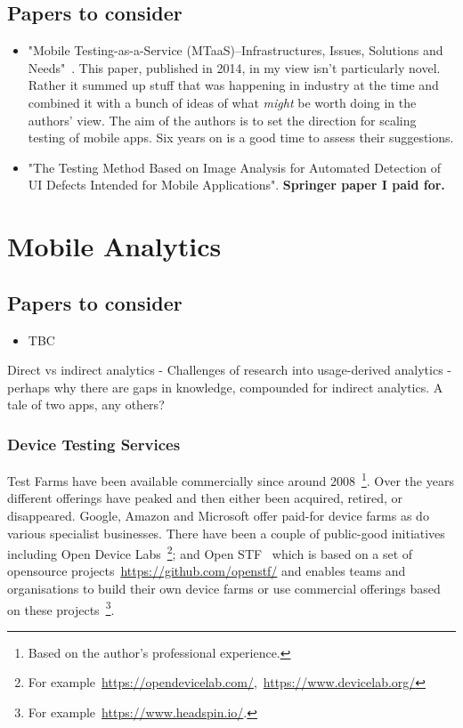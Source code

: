 \subsection{Papers to consider}
\begin{itemize}
    \item "Mobile Testing-as-a-Service (MTaaS)--Infrastructures, Issues, Solutions and Needs"~\cite{gao2014mobile}. This paper, published in 2014, in my view isn't particularly novel. Rather it summed up stuff that was happening in industry at the time and combined it with a bunch of ideas of what \emph{might} be worth doing in the authors' view. The aim of the authors is to set the direction for scaling testing of mobile apps. Six years on is a good time to assess their suggestions.
    \item "The Testing Method Based on Image Analysis for Automated Detection of UI Defects Intended for Mobile Applications". \textbf{Springer paper I paid for.}
\end{itemize}

\hypertarget{mobile.analytics}{}
\section{Mobile Analytics}

\subsection{Papers to consider}
\begin{itemize}
    \item TBC
\end{itemize}

Direct vs indirect analytics - 
Challenges of research into usage-derived analytics - perhaps why there are gaps in knowledge, compounded for indirect analytics. A tale of two apps, any others?

\subsubsection{Device Testing Services}
Test Farms have been available commercially since around 2008~\footnote{Based on the author's professional experience.}. Over the years different offerings have peaked and then either been acquired, retired, or disappeared. Google, Amazon and Microsoft offer paid-for device farms as do various specialist businesses. There have been a couple of public-good initiatives including Open Device Labs~\footnote{For example~\url{https://opendevicelab.com/},~\url{https://www.devicelab.org/}}; and Open STF~\cite{openstf_website} which is based on a set of opensource projects~\url{https://github.com/openstf/} and enables teams and organisations to build their own device farms or use commercial offerings based on these projects~\footnote{For example~\url{https://www.headspin.io/}.}.
